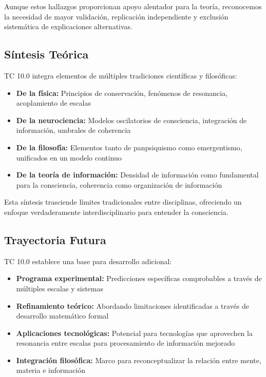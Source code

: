 \documentclass[12pt]{article}
\begin{document}
Aunque estos hallazgos proporcionan apoyo alentador para la teoría, reconocemos la necesidad de mayor validación, replicación independiente y exclusión sistemática de explicaciones alternativas.

\subsection{Síntesis Teórica}

TC 10.0 integra elementos de múltiples tradiciones científicas y filosóficas:

\begin{itemize}
    \item \textbf{De la física:} Principios de conservación, fenómenos de resonancia, acoplamiento de escalas
    
    \item \textbf{De la neurociencia:} Modelos oscilatorios de consciencia, integración de información, umbrales de coherencia
    
    \item \textbf{De la filosofía:} Elementos tanto de panpsiquismo como emergentismo, unificados en un modelo continuo
    
    \item \textbf{De la teoría de información:} Densidad de información como fundamental para la consciencia, coherencia como organización de información
\end{itemize}

Esta síntesis trasciende límites tradicionales entre disciplinas, ofreciendo un enfoque verdaderamente interdisciplinario para entender la consciencia.

\subsection{Trayectoria Futura}

TC 10.0 establece una base para desarrollo adicional:

\begin{itemize}
    \item \textbf{Programa experimental:} Predicciones específicas comprobables a través de múltiples escalas y sistemas
    
    \item \textbf{Refinamiento teórico:} Abordando limitaciones identificadas a través de desarrollo matemático formal
    
    \item \textbf{Aplicaciones tecnológicas:} Potencial para tecnologías que aprovechen la resonancia entre escalas para procesamiento de información mejorado
    
    \item \textbf{Integración filosófica:} Marco para reconceptualizar la relación entre mente, materia e información
\end{itemize}
\end{document}
